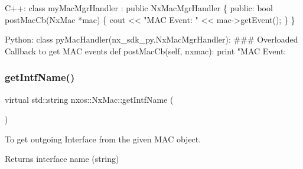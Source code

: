 \begin{DoxyCode}
C++:
   \textcolor{keyword}{class }myMacMgrHandler : \textcolor{keyword}{public} NxMacMgrHandler \{
      \textcolor{keyword}{public}:
         \textcolor{keywordtype}{bool} postMacCb(NxMac *mac) \{
              cout << \textcolor{stringliteral}{"MAC Event: "} << mac->getEvent();
         \}
   \}

Python:
   \textcolor{keyword}{class }pyMacHandler(nx\_sdk\_py.NxMacMgrHandler):
\textcolor{preprocessor}{   ### Overloaded Callback to get MAC events}
         def postMacCb(self, nxmac):
             print "MAC Event: %
\end{DoxyCode}
 \mbox{\label{classnxos_1_1_nx_mac_a4d29913106ccffd03fbd93fed04129eb}} 
\subsubsection{\texorpdfstring{get\+Intf\+Name()}{getIntfName()}}
{\footnotesize\ttfamily virtual std\+::string nxos\+::\+Nx\+Mac\+::get\+Intf\+Name (\begin{DoxyParamCaption}{ }\end{DoxyParamCaption})\hspace{0.3cm}{\ttfamily [pure virtual]}}

To get outgoing Interface from the given M\+AC object.

\begin{DoxyReturn}{Returns}
interface name (string)
\end{DoxyReturn}

 \mbox{\label{classnxos_1_1_nx_mac_ae1510492e7d8fe257f918c74bbe6b0ea}} 
